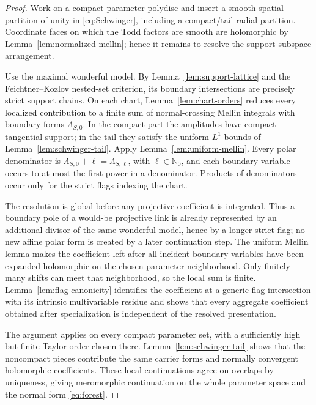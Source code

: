 \documentclass[11pt]{article}
\newcommand{\Nzero}{\mathbb N_0}
\begin{document}
\begin{proof}
Work on a compact parameter polydisc and insert a smooth spatial
partition of unity in \eqref{eq:Schwinger}, including a compact/tail
radial partition.  Coordinate faces on which the Todd factors are
smooth are holomorphic by Lemma~\ref{lem:normalized-mellin}; hence it
remains to resolve the support-subspace arrangement.

Use the maximal wonderful model.  By
Lemma~\ref{lem:support-lattice} and the Feichtner--Kozlov nested-set
criterion, its boundary intersections are precisely strict support
chains.  On each chart, Lemma~\ref{lem:chart-orders} reduces every
localized contribution to a finite sum of normal-crossing Mellin
integrals with boundary forms \(\Lambda_{S,0}\).  In the compact
part the amplitudes have compact tangential support; in the tail they
satisfy the uniform \(L^1\)-bounds of
Lemma~\ref{lem:schwinger-tail}.  Apply
Lemma~\ref{lem:uniform-mellin}.  Every polar denominator is
\(\Lambda_{S,0}+\ell=\Lambda_{S,\ell}\), with
\(\ell\in\Nzero\), and each boundary variable occurs to at most the
first power in a denominator.  Products of denominators occur only for
the strict flags indexing the chart.

The resolution is global before any projective coefficient is
integrated.  Thus a boundary pole of a would-be projective link is
already represented by an additional divisor of the same wonderful
model, hence by a longer strict flag; no new affine polar form is
created by a later continuation step.  The uniform Mellin lemma makes
the coefficient left after all incident boundary variables have been
expanded holomorphic on the chosen parameter neighborhood.  Only
finitely many shifts can meet that neighborhood, so the local sum is
finite.  Lemma~\ref{lem:flag-canonicity} identifies the coefficient at a
generic flag intersection with its intrinsic multivariable residue and
shows that every aggregate coefficient obtained after specialization is
independent of the resolved presentation.

The argument applies on every compact parameter set, with a sufficiently
high but finite Taylor order chosen there.  Lemma~\ref{lem:schwinger-tail}
shows that the noncompact pieces contribute the same carrier forms and
normally convergent holomorphic coefficients.  These local
continuations agree on overlaps by uniqueness, giving meromorphic
continuation on the whole parameter space and the normal form
\eqref{eq:forest}.
\end{proof}
\end{document}
